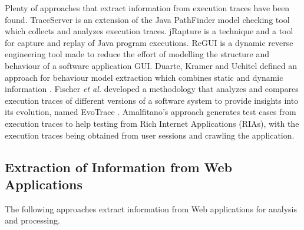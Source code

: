 Plenty of approaches that extract information from execution traces have been found. 
TraceServer \cite{andjelkovic2011trace} is an extension of the Java PathFinder model checking tool \cite{jpf} which collects and analyzes execution traces. jRapture \cite{steven2000jrapture} is a technique and a tool for capture and replay of Java program executions. ReGUI \cite{coimbra2011reverse,coimbra2012dynamic} is a dynamic reverse engineering tool made to reduce the effort of modelling the structure and behaviour of a software application GUI. Duarte, Kramer and Uchitel defined an approach for behaviour model extraction which combines static and dynamic information \cite{duarte2006model}. Fischer \textit{et al.} developed a methodology that analyzes and compares execution traces of different versions of a software system to provide insights into its evolution, named EvoTrace \cite{fischer2005system}. Amalfitano's approach \cite{amalfitano2010rich} generates test cases from execution traces to help testing from Rich Internet Applications (RIAs), with the execution traces being obtained from user sessions and crawling the application. 


\subsection{Extraction of Information from Web Applications}

The following approaches extract information from Web applications for analysis and processing. 


